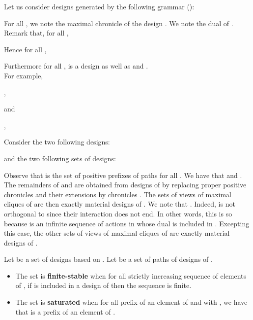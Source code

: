 \documentclass{LMCS}
\begin{document}
\begin{exa}\label{example-infini}





Let us consider designs generated by the following grammar ():\\
\begin{center}

\end{center}
\vspace{0,5em}

\noindent For all , we note  the maximal chronicle of the design . We note  the dual of . 
Remark that, for all , 

Hence for all , 

Furthermore for all ,  is a design as well as  and .\\
\vspace{1em}For example, 

, 

and
\begin{flushright}

,

\end{flushright}
Consider the two following designs:

and the two following sets of designs:

Observe that  is the set of positive prefixes of paths  for all .
We have that  and . 
The remainders of  and  are obtained from designs of  by replacing proper positive chronicles  and their extensions by chronicles . 
The sets of views of maximal cliques of  are then exactly material designs of .
We note that .
Indeed,  is not orthogonal to  since their interaction does not end.
In other words, this is so because  is an infinite sequence of actions in  whose dual is included in .
Excepting this case, the other sets of views of maximal cliques of  are exactly material designs of .
\end{exa}

  
\begin{defi}
Let  be a set of designs based on . Let  be a
set of paths of designs of .
\begin{itemize}[label=]
\item The set  is {\bf finite-stable} when 
for all strictly increasing sequence  of elements of , 
if  is included in a design of  
then the sequence  is finite.
\item The set  is {\bf saturated} when
	 for all  prefix of an element of  and
          with , we have that  is a prefix of an
         element of .
\end{itemize}
\end{defi}
 
\end{document}
